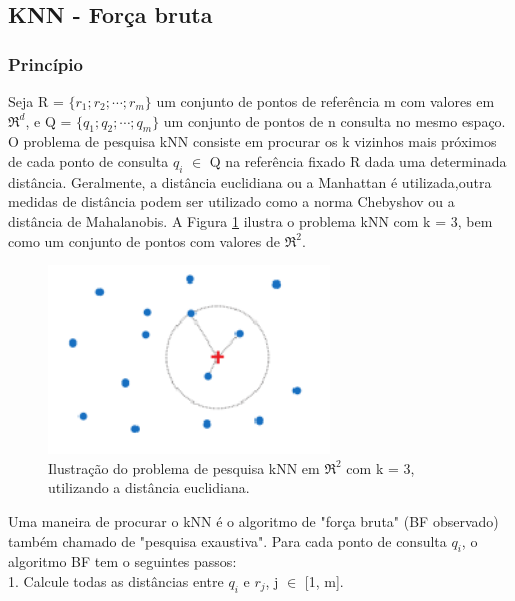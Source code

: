 \documentclass[letterpaper, 10 pt, conference]{ieeeconf}  %
\begin{document}
\subsection{KNN - Força bruta}
\subsubsection{Princípio}

Seja R = $\{r_1; r_2; \cdots ; r_m\}$ um conjunto de pontos de referência m com
valores em $\Re^d$, e Q = $\{q_1; q_2; \cdots ; q_m\}$ um conjunto de
pontos de n consulta no mesmo espaço. O problema de pesquisa kNN consiste em
procurar os k vizinhos mais próximos de cada ponto de consulta $q_i$ $\in$ Q na
referência fixado R dada uma determinada distância. Geralmente, a distância
euclidiana ou a Manhattan é utilizada,outra medidas de distância podem ser
utilizado como a norma Chebyshov ou a distância de
Mahalanobis. A Figura \ref{fig:Figura03} ilustra o problema kNN com k = 3, bem
como um conjunto de pontos com valores de $\Re^2$.

\begin{figure}[H]
\centering

\includegraphics[height=5cm]{imagens/knn.png}

\caption{Ilustração do problema de pesquisa kNN em $\Re^2$ com k = 3, utilizando a distância euclidiana.}
\label{fig:Figura03}
\end{figure}

Uma maneira de procurar o kNN é o algoritmo de "força bruta" (BF observado) também chamado de "pesquisa exaustiva". Para cada ponto de consulta $q_i$, o algoritmo BF tem o seguintes passos:\\

1. Calcule todas as distâncias entre $q_i$ e $r_j$, j $\in$ [1, m].\\
\end{document}
